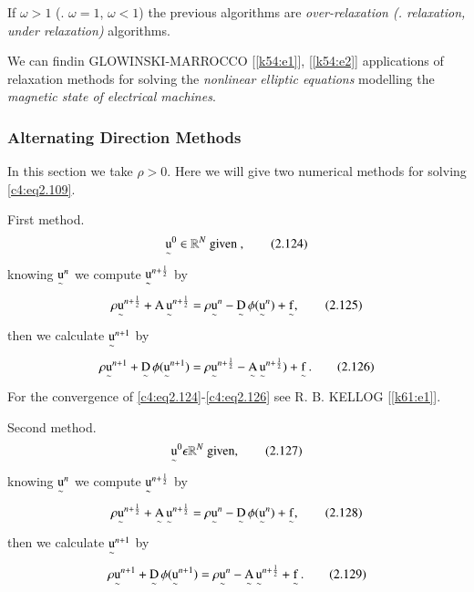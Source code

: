 \begin{remark}\label{c4:rem2.14}%
If $\omega > 1$ (\resp. $\omega = 1$, $\omega < 1$) the previous
algorithms are {\em over-relaxation (\resp. relaxation, under
  relaxation)} algorithms. 
\end{remark}

\begin{remark}\label{c4:rem2.15}%
We can find\pageoriginale  in GLOWINSKI-MARROCCO [\ref{k54:e1}],
[\ref{k54:e2}] applications
of relaxation methods for solving the {\em nonlinear elliptic
  equations} modelling the {\em magnetic state of electrical machines}.
\end{remark}

\subsubsection{Alternating Direction Methods}\label{c4:sss2.6.6} 

In this section we take $\rho > 0$. Here we will give two numerical
methods for solving \eqref{c4:eq2.109}. 

\noindent
First method.
\begin{equation}
{\operatorname*{u}\limits_{\sim}}^0 \in \mathbb{R}^N \text{ given },
\tag{2.124}\label{c4:eq2.124} 
\end{equation}
knowing ${\operatorname*{u}\limits_\sim}^n$ we compute ${\operatorname*{u}\limits_\sim}^{n+\frac{1}{2}}$ by
\begin{equation}
\rho {\operatorname*{u}\limits_\sim}^{n+\frac{1}{2}} + \operatorname*{A}{\operatorname*{u}\limits_\sim}^{n+\frac{1}{2}} = \rho
{\operatorname*{u}\limits_\sim}^n - \operatorname*{D}\limits_\sim \phi ({\operatorname*{u} \limits_\sim}^n ) + \operatorname*{f}
\limits_\sim, \tag{2.125}\label{c4:eq2.125}  
\end{equation}
then we calculate ${\operatorname*{u}\limits_\sim}^{n+1}$ by
\begin{equation}
\rho {\operatorname*{u}\limits_\sim}^{n+1} +\operatorname*{D} \limits_\sim\phi ({\operatorname*{u}
\limits_\sim}^{n+1}) = \rho {\operatorname*{u}\limits_\sim}^{n+\frac{1}{2}} -\operatorname*{A} \limits_\sim
{\operatorname*{u}\limits_\sim}^{n+\frac{1}{2}})+\operatorname*{f}
\limits_\sim. \tag{2.126}\label{c4:eq2.126}  
\end{equation}
For the convergence of \eqref{c4:eq2.124}-\eqref{c4:eq2.126} see
R. B. KELLOG [\ref{k61:e1}]. 

\noindent
Second method.
\begin{equation}
{\operatorname*{u}\limits_\sim}^0 \epsilon \mathbb{R}^N \text{ given},
\tag{2.127}\label{c4:eq2.127} 
\end{equation}
knowing ${\operatorname*{u} \limits_\sim}^n$ we compute ${\operatorname*{u} \limits_\sim}^{n+\frac{1}{2}}$ by 
\begin{equation}
\rho {\operatorname*{u}\limits_\sim}^{n+\frac{1}{2}} +\operatorname*{A} \limits_\sim {\operatorname*{u}\limits_\sim}^{n+\frac{1}{2}}
= \rho {\operatorname*{u}\limits_\sim}^n- \operatorname*{D} \limits_\sim \phi({\operatorname*{u} \limits_\sim}^n)+\operatorname*{f}
\limits_\sim, \tag{2.128}\label{c4:eq2.128} 
\end{equation}
then we calculate ${\operatorname*{u}\limits_\sim}^{n+1}$ by 
\begin{equation}
\rho {\operatorname*{u}\limits_\sim}^{n+1} +\operatorname*{D} \limits_\sim \phi ({\operatorname*{u}
  \limits_\sim}^{n+1}) = \rho {\operatorname*{u}\limits_\sim}^n- \operatorname*{A} \limits_\sim {\operatorname*{u}\limits_\sim}^{n+\frac{1}{2}}+\operatorname*{f} \limits_\sim. \tag{2.129}\label{c4:eq2.129} 
\end{equation}

